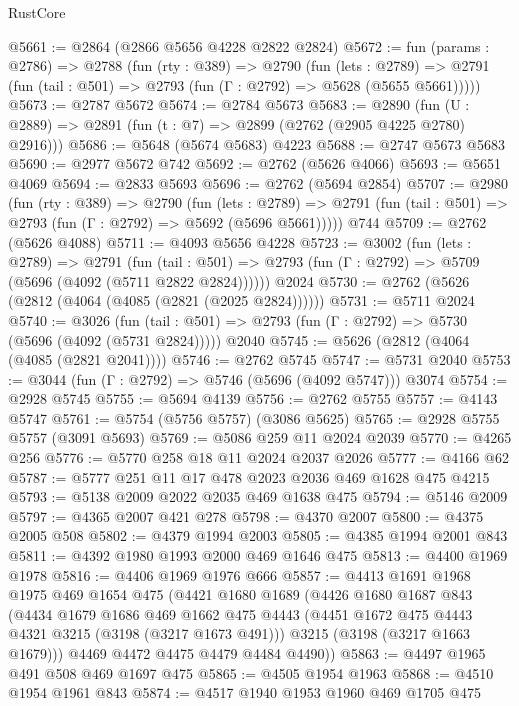 \begin{lexlean}{RustCore}
\begin{coremodule}
@5661 := @2864 (@2866 @5656 @4228 @2822 @2824)
@5672 := fun (params : @2786) =>
  @2788
    (fun (rty : @389) =>
    @2790
      (fun (lets : @2789) =>
      @2791 (fun (tail : @501) => @2793 (fun (Γ : @2792) => @5628 (@5655 @5661)))))
@5673 := @2787 @5672
@5674 := @2784 @5673
@5683 := @2890 (fun (U : @2889) => @2891 (fun (t : @7) => @2899 (@2762 (@2905 @4225 @2780) @2916)))
@5686 := @5648 (@5674 @5683) @4223
@5688 := @2747 @5673 @5683
@5690 := @2977 @5672 @742
@5692 := @2762 (@5626 @4066)
@5693 := @5651 @4069
@5694 := @2833 @5693
@5696 := @2762 (@5694 @2854)
@5707 := @2980
    (fun (rty : @389) =>
    @2790
      (fun (lets : @2789) =>
      @2791 (fun (tail : @501) => @2793 (fun (Γ : @2792) => @5692 (@5696 @5661)))))
    @744
@5709 := @2762 (@5626 @4088)
@5711 := @4093 @5656 @4228
@5723 := @3002
    (fun (lets : @2789) =>
    @2791
      (fun (tail : @501) => @2793 (fun (Γ : @2792) => @5709 (@5696 (@4092 (@5711 @2822 @2824))))))
    @2024
@5730 := @2762 (@5626 (@2812 (@4064 (@4085 (@2821 (@2025 @2824))))))
@5731 := @5711 @2024
@5740 := @3026
    (fun (tail : @501) => @2793 (fun (Γ : @2792) => @5730 (@5696 (@4092 (@5731 @2824)))))
    @2040
@5745 := @5626 (@2812 (@4064 (@4085 (@2821 @2041))))
@5746 := @2762 @5745
@5747 := @5731 @2040
@5753 := @3044 (fun (Γ : @2792) => @5746 (@5696 (@4092 @5747))) @3074
@5754 := @2928 @5745
@5755 := @5694 @4139
@5756 := @2762 @5755
@5757 := @4143 @5747
@5761 := @5754 (@5756 @5757) (@3086 @5625)
@5765 := @2928 @5755 @5757 (@3091 @5693)
@5769 := @5086 @259 @11 @2024 @2039
@5770 := @4265 @256
@5776 := @5770 @258 @18 @11 @2024 @2037 @2026
@5777 := @4166 @62
@5787 := @5777 @251 @11 @17 @478 @2023 @2036 @469 @1628 @475 @4215
@5793 := @5138 @2009 @2022 @2035 @469 @1638 @475
@5794 := @5146 @2009
@5797 := @4365 @2007 @421 @278
@5798 := @4370 @2007
@5800 := @4375 @2005 @508
@5802 := @4379 @1994 @2003
@5805 := @4385 @1994 @2001 @843
@5811 := @4392 @1980 @1993 @2000 @469 @1646 @475
@5813 := @4400 @1969 @1978
@5816 := @4406 @1969 @1976 @666
@5857 := @4413
    @1691
    @1968
    @1975
    @469
    @1654
    @475
    (@4421
      @1680
      @1689
      (@4426
        @1680
        @1687
        @843
        (@4434
          @1679
          @1686
          @469
          @1662
          @475
          @4443
          (@4451 @1672 @475 @4443 @4321 @3215 (@3198 (@3217 @1673 @491)))
          @3215
          (@3198 (@3217 @1663 @1679)))
        @4469
        @4472
        @4475
        @4479
        @4484
        @4490))
@5863 := @4497 @1965 @491 @508 @469 @1697 @475
@5865 := @4505 @1954 @1963
@5868 := @4510 @1954 @1961 @843
@5874 := @4517 @1940 @1953 @1960 @469 @1705 @475

\end{coremodule}
\end{lexlean}
